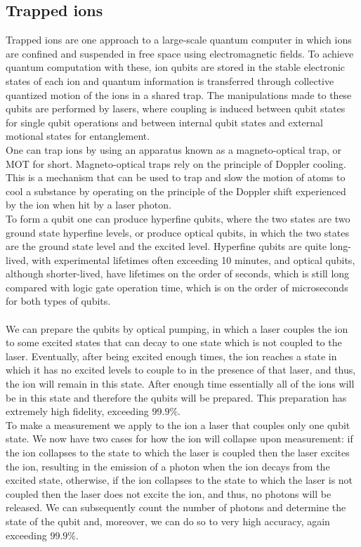 \subsection{Trapped ions}
Trapped ions are one approach to a large-scale quantum computer in which ions are confined and suspended in free space using electromagnetic fields. To achieve quantum computation with these, ion qubits are stored in the stable electronic states of each ion and quantum information is transferred through collective quantized motion of the ions in a shared trap. The manipulations made to these qubits are performed by lasers, where coupling is induced between qubit states for single qubit operations and between internal qubit states and external motional states for entanglement. \\
One can trap ions by using an apparatus known as a magneto-optical trap, or MOT for short. Magneto-optical traps rely on the principle of Doppler cooling. This is a mechanism that can be used to trap and slow the motion of atoms to cool a substance by operating on the principle of the Doppler shift experienced by the ion when hit by a laser photon. \\
To form a qubit one can produce hyperfine qubits, where the two states are two ground state hyperfine levels, or produce optical qubits, in which the two states are the ground state level and the excited level. Hyperfine qubits are quite long-lived, with experimental lifetimes often exceeding 10 minutes, and optical qubits, although shorter-lived, have lifetimes on the order of seconds, which is still long compared with logic gate operation time, which is on the order of microseconds for both types of qubits. \\
\\
We can prepare the qubits by optical pumping, in which a laser couples the ion to some excited states that can decay to one state which is not coupled to the laser. Eventually, after being excited enough times, the ion reaches a state in which it has no excited levels to couple to in the presence of that laser, and thus, the ion will remain in this state. After enough time essentially all of the ions will be in this state and therefore the qubits will be prepared. This preparation has extremely high fidelity, exceeding $99.9\%$. \\
To make a measurement we apply to the ion a laser that couples only one qubit state. We now have two cases for how the ion will collapse upon measurement: if the ion collapses to the state to which the laser is coupled then the laser excites the ion, resulting in the emission of a photon when the ion decays from the excited state, otherwise, if the ion collapses to the state to which the laser is not coupled then the laser does not excite the ion, and thus, no photons will be released. We can subsequently count the number of photons and determine the state of the qubit and, moreover, we can do so to very high accuracy, again exceeding $99.9\%$. \\

